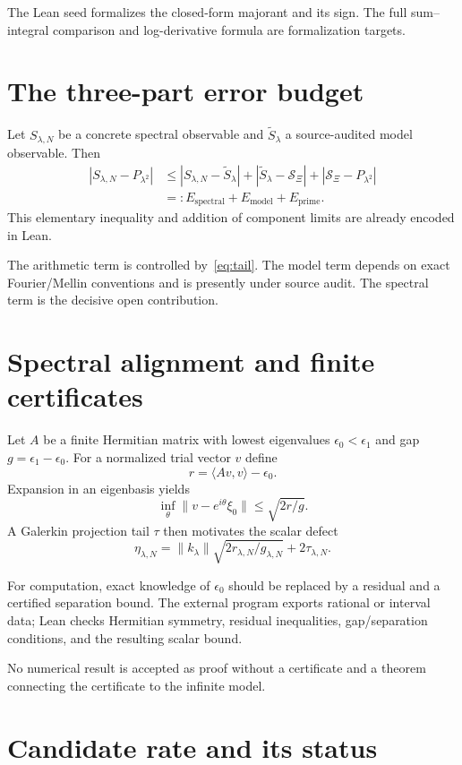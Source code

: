 \documentclass[11pt]{article}
\theoremstyle{definition}
\newcommand{\XiR}{\mathcal S_{\Xi}}
\begin{document}
The Lean seed formalizes the closed-form majorant and its sign.  The full
sum--integral comparison and log-derivative formula are formalization targets.

\section{The three-part error budget}

Let $S_{\lambda,N}$ be a concrete spectral observable and
$\widetilde S_\lambda$ a source-audited model observable.  Then
\begin{align}
|S_{\lambda,N}-P_{\lambda^2}|
&\le |S_{\lambda,N}-\widetilde S_\lambda|
 +|\widetilde S_\lambda-\XiR|
 +|\XiR-P_{\lambda^2}|\\
&=:E_{\mathrm{spectral}}+E_{\mathrm{model}}+E_{\mathrm{prime}}.
\end{align}
This elementary inequality and addition of component limits are already
encoded in Lean.

The arithmetic term is controlled by~\eqref{eq:tail}.  The model term depends
on exact Fourier/Mellin conventions and is presently under source audit.  The
spectral term is the decisive open contribution.

\section{Spectral alignment and finite certificates}

Let $A$ be a finite Hermitian matrix with lowest eigenvalues
$\epsilon_0<\epsilon_1$ and gap $g=\epsilon_1-\epsilon_0$.  For a normalized
trial vector $v$ define
\[
r=\langle Av,v\rangle-\epsilon_0.
\]
Expansion in an eigenbasis yields
\[
\inf_\theta\|v-e^{i\theta}\xi_0\|\le\sqrt{2r/g}.
\]
A Galerkin projection tail $\tau$ then motivates the scalar defect
\[
\eta_{\lambda,N}
=\|k_\lambda\|\sqrt{2r_{\lambda,N}/g_{\lambda,N}}+2\tau_{\lambda,N}.
\]

For computation, exact knowledge of $\epsilon_0$ should be replaced by a
residual and a certified separation bound.  The external program exports
rational or interval data; Lean checks Hermitian symmetry, residual inequalities,
gap/separation conditions, and the resulting scalar bound.

No numerical result is accepted as proof without a certificate and a theorem
connecting the certificate to the infinite model.

\section{Candidate rate and its status}
\end{document}
